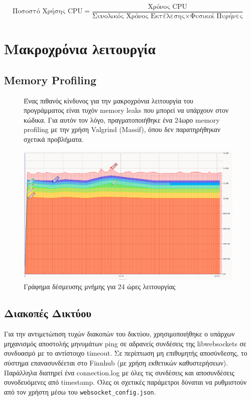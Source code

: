\documentclass[12pt]{article}
\begin{document}
\[
    \text{Ποσοστό Χρήσης CPU} = \frac{\text{Χρόνος CPU}}{\text{Συνολικός Χρόνος Εκτέλεσης} \times \text{Φυσικοί Πυρήνες}}
\]
\section{Μακροχρόνια λειτουργία}
\subsection{Memory Profiling}
\begin{figure}[H]
    \centering
    \begin{minipage}{0.45\textwidth}
        Ένας πιθανός κίνδυνος για την μακροχρόνια λειτουργία του προγράμματος είναι τυχόν memory leaks που μπορεί να υπάρχουν στον κώδικα. 
        Για αυτόν τον λόγο, πραγματοποιήθηκε ένα 24ωρο memory profiling με την χρήση Valgrind (Massif), όπου δεν παρατηρήθηκαν σχετικά προβλήματα.
    \end{minipage}
    \hfill
    \begin{minipage}{0.45\textwidth}
        \centering
        \includegraphics[width=\linewidth]{massif.png} %
        \caption{Γράφημα δέσμευσης μνήμης για 24 ώρες λειτουργίας}
        \label{fig:massif}
    \end{minipage}
\end{figure}


\subsection{Διακοπές Δικτύου}
Για την αντιμετώπιση τυχών διακοπών του δικτύου, χρησιμοποιήθηκε ο υπάρχων μηχανισμός αποστολής μηνυμάτων ping σε αδρανείς συνδέσεις της libwebsockets σε συνδυασμό με το αντίστοιχο timeout. Σε περίπτωση μη επιθυμητής αποσύνδεσης, το σύστημα επανασυνδέεται στο Finnhub (με χρήση εκθετικών καθυστερήσεων). Παράλληλα διατηρεί ένα connection.log με όλες τις συνδέσεις και αποσυνδέσεις συνοδευόμενες από timestamp. Όλες οι σχετικές παράμετροι δύναται να ρυθμιστούν από τον χρήστη μέσω του \texttt{websocket\_config.json}.
\end{document}
